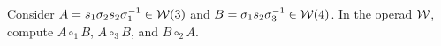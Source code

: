 \begin{Exercise}
    Consider \( A = s_1 \sigma_2 s_2 \sigma_1^{-1} \in \mathcal{W}(3) \) and \( B = \sigma_1 s_2\sigma_3^{-1} \in \mathcal{W}(4) \). 
    In the operad \( \mathcal{W} \), compute \( A \circ_1 B \), \( A \circ_3 B \), and \( B \circ_2 A \). 
\end{Exercise}







